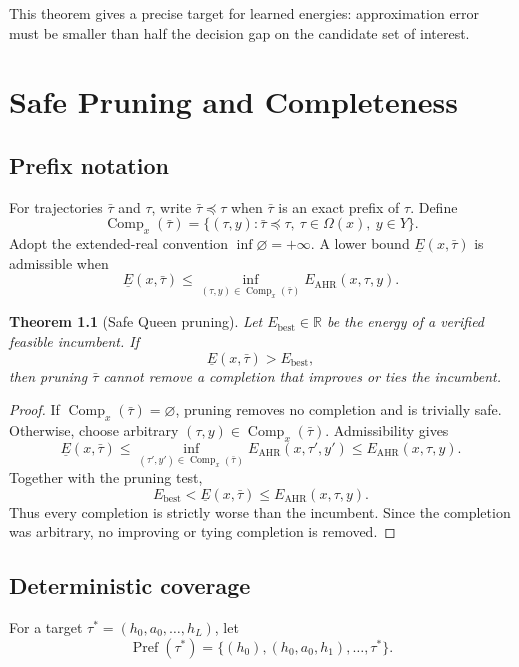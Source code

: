 \documentclass[11pt,oneside]{book}
\newtheorem{theorem}[definition]{Theorem}
\theoremstyle{remark}
\newcommand{\Om}{\Omega}
\DeclareMathOperator{\Pref}{Pref}
\DeclareMathOperator{\Comp}{Comp}
\begin{document}
This theorem gives a precise target for learned energies: approximation error must be smaller than half the decision gap on the candidate set of interest.

\chapter{Safe Pruning and Completeness}

\section{Prefix notation}

For trajectories $\bar\tau$ and $\tau$, write $\bar\tau\preceq\tau$ when $\bar\tau$ is an exact prefix of $\tau$. Define
\[
\Comp_x(\bar\tau)=
\{(\tau,y):\bar\tau\preceq\tau,\ \tau\in\Om(x),\ y\in Y\}.
\]
Adopt the extended-real convention $\inf\varnothing=+\infty$.
A lower bound $\underline E(x,\bar\tau)$ is admissible when
\[
\underline E(x,\bar\tau)
\le\inf_{(\tau,y)\in\Comp_x(\bar\tau)}E_{\mathrm{AHR}}(x,\tau,y).
\]

\begin{theorem}[Safe Queen pruning]
Let $E_{\mathrm{best}}\in\mathbb R$ be the energy of a verified feasible
incumbent. If
\[
\underline E(x,\bar\tau)>E_{\mathrm{best}},
\]
then pruning $\bar\tau$ cannot remove a completion that improves or ties the incumbent.
\end{theorem}

\begin{proof}
If $\Comp_x(\bar\tau)=\varnothing$, pruning removes no completion and is
trivially safe. Otherwise, choose arbitrary
$(\tau,y)\in\Comp_x(\bar\tau)$. Admissibility gives
\[
\underline E(x,\bar\tau)
\le\inf_{(\tau',y')\in\Comp_x(\bar\tau)}
E_{\mathrm{AHR}}(x,\tau',y')
\le E_{\mathrm{AHR}}(x,\tau,y).
\]
Together with the pruning test,
\[
E_{\mathrm{best}}
<\underline E(x,\bar\tau)
\le E_{\mathrm{AHR}}(x,\tau,y).
\]
Thus every completion is strictly worse than the incumbent. Since the
completion was arbitrary, no improving or tying completion is removed.
\end{proof}

\section{Deterministic coverage}

For a target $\tau^*=(h_0,a_0,\ldots,h_L)$, let
\[
\Pref(\tau^*)=\{(h_0),(h_0,a_0,h_1),\ldots,\tau^*\}.
\]
\end{document}
